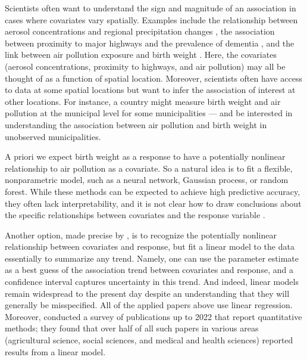 Scientists often want to understand the sign and magnitude of an association in cases where covariates vary spatially. Examples include the relationship between aerosol concentrations and regional precipitation changes \citep{westervelt_connecting_2018}, 
the association between proximity to major highways and the prevalence of dementia \citep{li_relationships_2023}, and the link between air pollution exposure and birth weight \citep{lee_association_2022}. Here, the covariates (aerosol concentrations, proximity to highways, and air pollution) may all be thought of as a function of spatial location. Moreover, scientists often have access to data at some spatial locations but want to infer the association of interest at other locations. For instance, a country might measure birth weight and air pollution at the municipal level for some municipalities --- and be interested in understanding the association between air pollution and birth weight in unobserved municipalities.

A priori we expect birth weight as a response to have a potentially nonlinear relationship to air pollution as a covariate. So a natural idea is to fit a flexible, nonparametric model, such as a neural network, Gaussian process, or random forest. While these methods can be expected to achieve high predictive accuracy, they often lack interpretability, and it is not clear how to draw conclusions about the specific relationships between covariates and the response variable \citep{rudin2019stop,DoshiVelez2017TowardsAR}.

Another option, made precise by \citet{buja_models_2019}, is to recognize the potentially nonlinear relationship between covariates and response, but fit a linear model to the data essentially to summarize any trend. Namely, one can use the parameter estimate as a best guess of the association trend between covariates and response, and a confidence interval captures uncertainty in this trend. And indeed, linear models remain widespread to the present day despite an understanding that they will generally be misspecified. All of the applied papers above use linear regression. Moreover, \citet[Figure 1]{castro_torres_use_2024} conducted a survey of publications up to 2022 that report quantitative methods; they found that over half of all such papers in various areas (agricultural science, social sciences, and medical and health sciences) reported results from a linear model.

